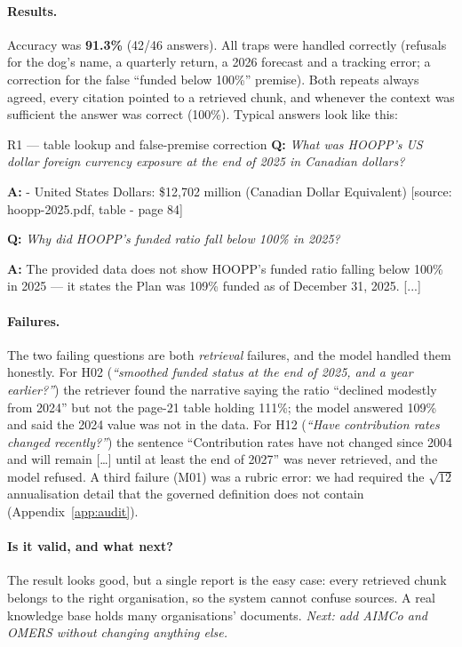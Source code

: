 \documentclass[11pt,a4paper]{article}
\newcommand{\Q}[1]{\noindent\textbf{Q:} \textit{#1}\par\smallskip}
\newcommand{\A}[1]{\noindent\textbf{A:} {\small\ttfamily #1}\par}
\begin{document}
\paragraph{Results.} Accuracy was \textbf{91.3\%} (42/46 answers). All traps were handled correctly (refusals for
the dog's name, a quarterly return, a 2026 forecast and a tracking error; a correction for the false
``funded below 100\%'' premise). Both repeats always agreed, every citation pointed to a retrieved chunk, and
whenever the context was sufficient the answer was correct (100\%). Typical answers look like this:

\begin{qa}{R1 --- table lookup and false-premise correction}
\Q{What was HOOPP's US dollar foreign currency exposure at the end of 2025 in Canadian dollars?}
\A{- United States Dollars: \$12,702 million (Canadian Dollar Equivalent) [source: hoopp-2025.pdf, table - page 84]}
\medskip
\Q{Why did HOOPP's funded ratio fall below 100\% in 2025?}
\A{The provided data does not show HOOPP's funded ratio falling below 100\% in 2025 --- it states the Plan was 109\% funded as of December 31, 2025. [...]}
\end{qa}

\paragraph{Failures.} The two failing questions are both \emph{retrieval} failures, and the model handled them
honestly. For H02 (\emph{``smoothed funded status at the end of 2025, and a year earlier?''}) the retriever found
the narrative saying the ratio ``declined modestly from 2024'' but not the page-21 table holding 111\%; the model
answered 109\% and said the 2024 value was not in the data. For H12 (\emph{``Have contribution rates changed
recently?''}) the sentence ``Contribution rates have not changed since 2004 and will remain [\ldots] until at least
the end of 2027'' was never retrieved, and the model refused. A third failure (M01) was a rubric error: we had
required the $\sqrt{12}$ annualisation detail that the governed definition does not contain (Appendix~\ref{app:audit}).

\paragraph{Is it valid, and what next?} The result looks good, but a single report is the easy case: every
retrieved chunk belongs to the right organisation, so the system cannot confuse sources. A real knowledge base
holds many organisations' documents. \emph{Next: add AIMCo and OMERS without changing anything else.}
\end{document}
